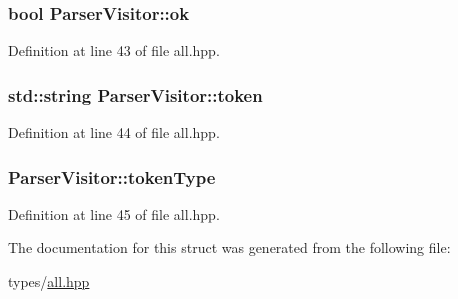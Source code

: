 \subsubsection[{ok}]{\setlength{\rightskip}{0pt plus 5cm}bool Parser\+Visitor\+::ok}\label{struct_parser_visitor_af5c2d247a1ec646aded499e01ca71553}


Definition at line 43 of file all.\+hpp.

\hypertarget{struct_parser_visitor_a75c39e97645b48c171b9912440aa9ca2}{}
\subsubsection[{token}]{\setlength{\rightskip}{0pt plus 5cm}std\+::string Parser\+Visitor\+::token}\label{struct_parser_visitor_a75c39e97645b48c171b9912440aa9ca2}


Definition at line 44 of file all.\+hpp.

\hypertarget{struct_parser_visitor_acaa4d8ca1662ec314ae2a8f048f6aca3}{}
\subsubsection[{token\+Type}]{ Parser\+Visitor\+::token\+Type}\label{struct_parser_visitor_acaa4d8ca1662ec314ae2a8f048f6aca3}


Definition at line 45 of file all.\+hpp.



The documentation for this struct was generated from the following file\+:\begin{DoxyCompactItemize}
\item 
types/\hyperlink{all_8hpp}{all.\+hpp}\end{DoxyCompactItemize}
